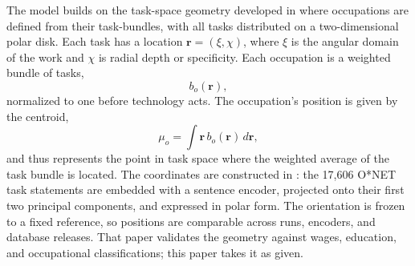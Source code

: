 \documentclass[12pt, a4paper]{article}
\begin{document}
The model builds on the task-space geometry developed in
\textcite{storck2026geometry} where occupations are defined from their task-bundles,
with all tasks distributed on a two-dimensional polar disk.
Each task has a location $\mathbf{r}=(\xi,\chi)$, where
$\xi$ is the angular domain of the work and $\chi$ is radial depth or
specificity. Each occupation is a weighted bundle of tasks,
\[
  b_o(\mathbf{r}),
\]
normalized to one before technology acts. The occupation's position is given by the centroid,
\[
  \mu_o = \int \mathbf{r}\,b_o(\mathbf{r})\,d\mathbf{r},
\]
and thus represents the point in task space where the weighted average of the task bundle is located.
The coordinates are constructed in \textcite{storck2026geometry}: the
17{,}606 O*NET task statements are embedded with a sentence encoder,
projected onto their first two principal components, and expressed in
polar form. The orientation is frozen to a fixed reference, so
positions are comparable across runs, encoders, and database releases.
That paper validates the geometry against wages, education, and
occupational classifications; this paper takes it as given.
\end{document}
